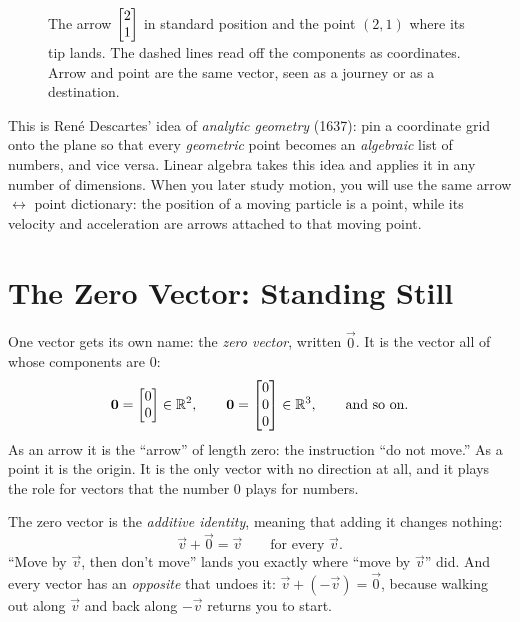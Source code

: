 \begin{figure}[H]
\centering
{}
\caption{The arrow $\begin{bmatrix}2\\1\end{bmatrix}$ in standard position and the point $(2,1)$ where its
tip lands. The dashed lines read off the components as coordinates. Arrow and point are
the same vector, seen as a journey or as a destination.}
\label{ch02:fig-point}
\end{figure}

\begin{connectionbox}
This is René Descartes' idea of \emph{analytic geometry} (1637): pin a coordinate grid
onto the plane so that every \emph{geometric} point becomes an \emph{algebraic} list of
numbers, and vice versa. Linear algebra takes this idea and applies it in any number of
dimensions. When you later study motion, you will use the same arrow $\leftrightarrow$
point dictionary: the position of a moving particle is a point, while its velocity and
acceleration are arrows attached to that moving point.
\end{connectionbox}

\section{The Zero Vector: Standing Still}
\label{ch02:zero}

One vector gets its own name: the \emph{zero vector}, written $\vec{0}$.
It is the vector all of whose components are $0$:
\[
  \mathbf{0} = \begin{bmatrix}0\\0\end{bmatrix} \in \mathbb{R}^2,\qquad
  \mathbf{0} = \begin{bmatrix}0\\0\\0\end{bmatrix} \in \mathbb{R}^3,\qquad
  \text{and so on.}
\]
As an arrow it is the ``arrow'' of length zero: the instruction ``do not move.'' As a
point it is the origin. It is the only vector with no direction at all, and it plays the
role for vectors that the number $0$ plays for numbers.

\begin{focusbox}
The zero vector is the \emph{additive identity}, meaning that adding it changes nothing:
\[
  \vec{v} + \vec{0} = \vec{v}\qquad\text{for every }\vec{v}.
\]
``Move by $\vec{v}$, then don't move'' lands you exactly where ``move by $\vec{v}$'' did.
And every vector has an \emph{opposite} that undoes it: $\vec{v} + (-\vec{v}) = \vec{0}$,
because walking out along $\vec{v}$ and back along $-\vec{v}$ returns you to start.
\end{focusbox}

